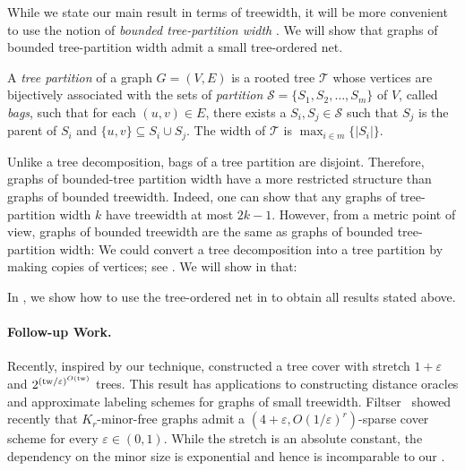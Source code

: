 \documentclass{article}
\makeatletter
\newcommand{\tp}{{\rm tp}}
\newcommand{\tw}{{\rm tw}}
\newcommand{\poly}{\mathrm{poly}}
\def\eps{\varepsilon}
\newcommand\IfRestateTF{%
  \ifx\label\thmt@gobble@label %
    \expandafter\@firstoftwo
  \else
    \expandafter\@secondoftwo
  \fi
}
\newcommand{\RestateRemark}{\IfRestateTF{{\normalfont\bfseries (Restated) }}{}}
\makeatother
\begin{document}
While we state our main result in terms of treewidth, it will be more convenient to use the notion of  \emph{bounded tree-partition width} \cite{DBLP:journals/dm/DingO96}. We will show that graphs of bounded tree-partition width admit a small tree-ordered net.

\begin{definition} A \emph{tree partition} of a graph  $G=(V,E)$ is a  rooted tree $\mathcal{T}$ whose vertices are bijectively associated with the sets of  \emph{partition} $\mathcal{S} = \{S_1,S_2,\ldots,S_m\}$ of $V$, called \emph{bags}, such that for each $(u,v) \in E$, there exists a $S_i,S_j \in \mathcal{S}$ such that $S_j$ is the parent of $S_i$ and $\{u,v\} \subseteq S_i \cup S_j$. The width of $\mathcal{T}$ is $\max_{i\in m}\{|S_i|\}$.
\end{definition}


Unlike a tree decomposition, bags of a tree partition are disjoint.  Therefore, graphs of bounded-tree partition width have a more restricted structure than graphs of bounded treewidth. Indeed, one can show that any graphs of tree-partition width $k$ have treewidth at most $2k-1$. However, from a metric point of view, graphs of bounded treewidth are the same as graphs of bounded tree-partition width: We could convert a tree decomposition into a tree partition by making copies of vertices; see . We will show in  that: 



In , we show how to use the tree-ordered net in  to obtain all results stated above. 


\paragraph*{Follow-up Work.~} Recently, inspired by our technique, \cite{CCLMST23} constructed a tree cover with stretch $1+\eps$ and $2^{(\tw / \eps)^{O(\tw)}}$ trees. This result has applications to constructing distance oracles and approximate labeling schemes for graphs of small treewidth. Filtser~\cite{Filtser24} showed recently that $K_r$-minor-free graphs admit a $(4+\eps,O(1/\eps)^{r})$-sparse cover scheme for every  $\eps \in (0,1)$. While the stretch is an absolute constant, the dependency on the minor size is exponential and hence is incomparable to our .
\end{document}

